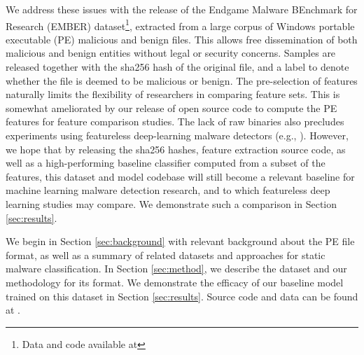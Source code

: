 We address these issues with the release of the Endgame Malware BEnchmark for Research (EMBER) dataset\footnote{Data and code available at \SOURCECODE}, extracted from a large corpus of Windows portable executable (PE) malicious and benign files.  This allows free dissemination of both malicious and benign entities without legal or security concerns.  Samples are released together with the sha256 hash of the original file, and a label to denote whether the file is deemed to be malicious or benign.  The pre-selection of features naturally limits the flexibility of researchers in comparing feature sets.  This is somewhat ameliorated by our release of open source code to compute the PE features for feature comparison studies. The lack of raw binaries also precludes experiments using featureless deep-learning malware detectors (e.g., \cite{raff2017malware}).  However, we hope that by releasing the sha256 hashes, feature extraction source code, as well as a high-performing baseline classifier computed from a subset of the features, this dataset and model codebase will still become a relevant baseline for machine learning malware detection research, and to which featureless deep learning studies may compare.  We demonstrate such a comparison in Section \ref{sec:results}.

We begin in Section \ref{sec:background} with relevant background about the PE file format, as well as a summary of related datasets and approaches for static malware classification.  In Section \ref{sec:method}, we describe the dataset and our methodology for its format.  We demonstrate the efficacy of our baseline model trained on this dataset in Section \ref{sec:results}. Source code and data can be found at \SOURCECODE.
